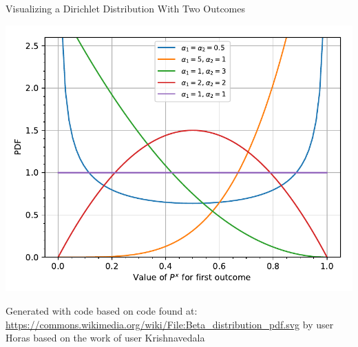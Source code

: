\documentclass[11pt]{beamer}
\begin{document}
	\begin{frame}{Visualizing a Dirichlet Distribution With Two Outcomes}
		\begin{center}
			\includegraphics[width=0.75\linewidth]{dirichlet_distribution_pdf}
		\end{center}
		
		\begin{tiny}
			Generated with code based on code found at: \url{https://commons.wikimedia.org/wiki/File:Beta_distribution_pdf.svg} by user Horas based on the work of user Krishnavedala
		\end{tiny}
	\end{frame}
		
\end{document}
